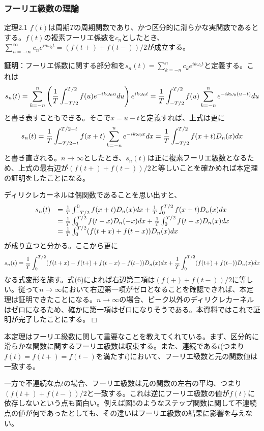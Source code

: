 \documentclass[dvipdfmx, 9pt, a4paper]{jsarticle}
\def\qed{\hfill $\Box$}
\begin{document}
\subsubsection{フーリエ級数の理論}
\begin{itembox}[l]{定理2.1}
$f(t)$は周期$T$の周期関数であり、かつ区分的に滑らかな実関数であるとする。$f(t)$の複素フーリエ係数を$c_n$としたとき、$\sum_{n =-\infty}^\infty c_n e^{in\omega_0t}=(f(t+)+f(t-))/2$が成立する。
\end{itembox}
{\bf 証明}：フーリエ係数に関する部分和を$s_n(t)=\sum_{k=-n}^nc_ke^{ik\omega_0t}$と定義する。これは
\begin{equation}
s_n(t)=\sum_{k=-n}^n\left(\frac{1}{T}\int_{-T/2}^{T/2}f(u)e^{-ik\omega_0u}du\right)e^{ik\omega_0t}=\frac{1}{T}\int_{-T/2}^{T/2}f(u)\sum_{k=-n}^ne^{-ik\omega_0(u-t)}du \notag
\end{equation}
と書き表すこともできる。そこで$x=u-t$と定義すれば、上式は更に
\begin{equation}
s_n(t)=\frac{1}{T}\int_{-T/2-t}^{T/2-t}f(x+t)\sum_{k=-n}^ne^{-ik\omega_0x}dx=\frac{1}{T}\int_{-T/2}^{T/2}f(x+t)D_n(x)dx \notag
\end{equation}
と書き直される。$n \to \infty$としたとき、$s_n(t)$は正に複素フーリエ級数となるため、上式の最右辺が$(f(t+)+f(t-))/2$と等しいことを確かめれば本定理の証明をしたことになる。\par
ディリクレカーネルは偶関数であることを思い出すと、
\begin{equation}
\begin{array}{ll}
s_n(t) & = \frac{1}{T}\int_{-T/2}^{0}f(x+t)D_n(x)dx+\frac{1}{T}\int_{0}^{T/2}f(x+t)D_n(x)dx \\
& =\frac{1}{T}\int_{0}^{T/2}f(t-x)D_n(-x)dx+\frac{1}{T}\int_{0}^{T/2}f(t+x)D_n(x)dx \\
& =\frac{1}{T}\int_{0}^{T/2}(f(t+x)+f(t-x))D_n(x)dx
\end{array}\notag
\end{equation}
が成り立つと分かる。ここから更に
\begin{equation}
s_n(t)=\frac{1}{T}\int_{0}^{T/2}(f(t+x)-f(t+)+f(t-x)-f(t-))D_n(x)dx+\frac{1}{T}\int_{0}^{T/2}(f(t+)+f(t-))D_n(x)dx \notag
\end{equation}
なる式変形を施す。式(6)によれば右辺第二項は$(f(+)+f(t-))/2$に等しい。従って$n \to \infty$において右辺第一項がゼロとなることを確認できれば、本定理は証明できたことになる。$n \to \infty$の場合、ピーク以外のディリクレカーネルはゼロになるため、確かに第一項はゼロになりそうである。本資料ではこれで証明が完了したことにする。\qed \par
本定理はフーリエ級数に関して重要なことを教えてくれている。まず、区分的に滑らかな関数に関するフーリエ級数は収束する。また、連続である$t$(つまり$f(t)=f(t+)=f(t-)$を満たす$t$)において、フーリエ級数と元の関数値は一致する。\par
一方で不連続な点$t$の場合、フーリエ級数は元の関数の左右の平均、つまり$(f(t+)+f(t-))/2$と一致する。これは逆にフーリエ級数の値が$f(t)$に依存しないという点も面白い。例えば図5のようなステップ関数に関して不連続点の値が何であったとしても、その違いはフーリエ級数の結果に影響を与えない。
\end{document}
